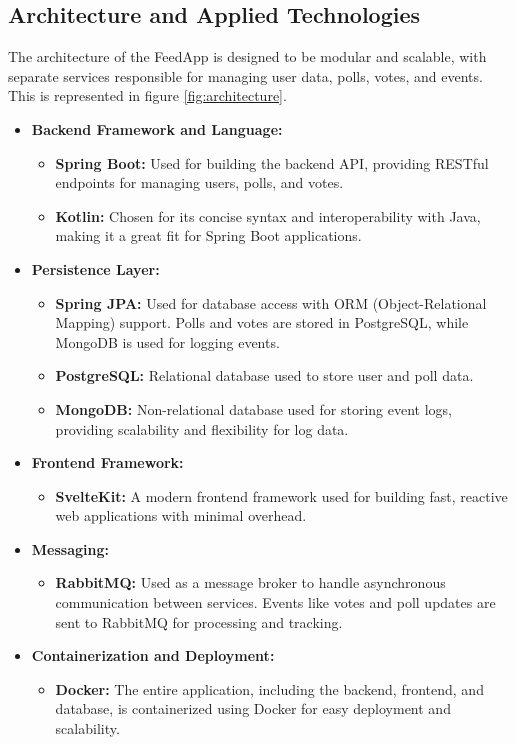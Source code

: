 \subsection{Architecture and Applied Technologies}
The architecture of the FeedApp is designed to be modular and scalable, with separate services responsible for managing user data, polls, votes, and events. This is represented in figure \ref{fig:architecture}. 
\begin{itemize}
    \item \textbf{Backend Framework and Language:} 
    \begin{itemize}
        \item \textbf{Spring Boot:} Used for building the backend API, providing RESTful endpoints for managing users, polls, and votes.
        \item \textbf{Kotlin:} Chosen for its concise syntax and interoperability with Java, making it a great fit for Spring Boot applications.
    \end{itemize}
    
    \item \textbf{Persistence Layer:} 
    \begin{itemize}
        \item \textbf{Spring JPA:} Used for database access with ORM (Object-Relational Mapping) support. Polls and votes are stored in PostgreSQL, while MongoDB is used for logging events.
        \item \textbf{PostgreSQL:} Relational database used to store user and poll data.
        \item \textbf{MongoDB:} Non-relational database used for storing event logs, providing scalability and flexibility for log data.
    \end{itemize}
    
    \item \textbf{Frontend Framework:} 
    \begin{itemize}
        \item \textbf{SvelteKit:} A modern frontend framework used for building fast, reactive web applications with minimal overhead.
    \end{itemize}
    
    \item \textbf{Messaging:}
    \begin{itemize}
        \item \textbf{RabbitMQ:} Used as a message broker to handle asynchronous communication between services. Events like votes and poll updates are sent to RabbitMQ for processing and tracking.
    \end{itemize}
    \item \textbf{Containerization and Deployment:} 
    \begin{itemize}
        \item \textbf{Docker:} The entire application, including the backend, frontend, and database, is containerized using Docker for easy deployment and scalability.
    \end{itemize}
\end{itemize}


